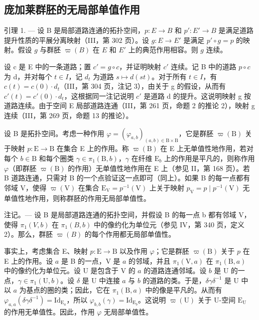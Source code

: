\subsection{庞加莱群胚的无局部单值作用}

引理 1. --- 设 B 是局部道路连通的拓扑空间，\(p \colon E \to B\) 和 \(p' \colon E' \to B\) 是满足道路提升性质的平展分离映射（III，第 302 页）。设 \(g \colon E \to E'\) 是满足 \(p' \circ g = p\) 的映射。假设 \(g\) 与群胚 \(\varpi(B)\) 在 \(E\) 和 \(E'\) 上的典范作用相容。则 \(g\) 连续。

设 c 是 E 中的一条道路；置 \(c' = g \circ c\)，并证明映射 \(c'\) 连续。记 B 中的道路 \(p \circ c\) 为 d，并对每个 \(t \in I\)，记 \(d_t\) 为道路 \(s \mapsto d(st)\)。对于所有 \(t \in I\)，有 \(c(t) = c(0) \cdot d_t\)（III，第 304 页，注记 3），由关于 g 的假设，从而有 \(c'(t) = c'(0) \cdot d_t\)，这根据同一注记说明 \(c'\) 是道路 d 的提升。这说明映射 g 按道路连续。由于空间 E 局部道路连通（III，第 261 页，命题 2 的推论 2），映射 g 连续（III，第 269 页，命题 13 的推论）。

设 B 是拓扑空间。考虑一种作用 \(\varphi = (\varphi_{a,b})_{(a,b)\in \mathrm{B}\times \mathrm{B}}\)，它是群胚 \(\varpi (\mathrm{B})\) 关于映射 \(p\colon \mathrm{E}\to \mathrm{B}\) 在集合 E 上的作用。称 \(\varpi (\mathrm{B})\) 在 E 上无单值性地作用，若对每个 \(b\in \mathrm{B}\) 和每个圈类 \(\gamma \in \pi_1(\mathrm{B},b)\)，\(\gamma\) 在纤维 \(\mathrm{E}_b\) 上的作用是平凡的，则称作用 \(\varphi\)（即群胚 \(\varpi (\mathrm{B})\) 的作用）无单值性地作用在 E 上（参见 II，第 168 页）。若 B 道路连通，只需对 B 的一个点验证这一点即可（同上）。如果 B 的每一点都有邻域 V，使得 \(\varpi (\mathrm{V})\) 在集合 \(\mathrm{E_V} = p^{-1}(\mathrm{V})\) 上关于映射 \(p_{\mathrm{V}} = p\mid p^{-1}(\mathrm{V})\) 无单值性地作用，则称群胚的作用无局部单值性。

注记。--- 设 B 是局部道路连通的拓扑空间，并假设 B 的每一点 b 都有邻域 V，使得 \(\pi_{1}(V,b)\) 在 \(\pi_{1}(B,b)\) 中的像约化为单位元（参见 IV，第 340 页，定义 2）。那么，群胚 \(\varpi(B)\) 的每个作用都无局部单值性。

事实上，考虑集合 E、映射 \(p \colon \mathrm{E} \to \mathrm{B}\) 以及作用 \(\varphi\)；它是群胚 \(\varpi(\mathrm{B})\) 关于 \(p\) 在 E 上的作用。设 \(a\) 是 B 的一点，V 是 \(a\) 的邻域，并且 \(\pi_1(\mathrm{V}, a)\) 在 \(\pi_1(\mathrm{B}, a)\) 中的像约化为单位元。设 U 是包含于 V 的 \(a\) 的道路连通邻域。设 \(b\) 是 U 的一点，\(\gamma \in \pi_1(\mathrm{U}, b)\)。设 \(\delta\) 是 U 中连接 \(a\) 与 \(b\) 的道路的类。于是，\(\delta\gamma\delta^{-1}\) 是 U 中以 \(a\) 为基点的圈的类；因此，它在 \(\pi_1(\mathrm{B}, a)\) 中的像是平凡的。从而有 \(\varphi_{a,a}(\delta\gamma\delta^{-1}) = \mathrm{Id}_{\mathrm{E}_a}\)，所以 \(\varphi_{b,b}(\gamma) = \mathrm{Id}_{\mathrm{E}_b}\)。这说明 \(\varpi(\mathrm{U})\) 关于 U-空间 \(\mathrm{E_U}\) 的作用无单值性。因此，作用 \(\varphi\) 无局部单值性。

